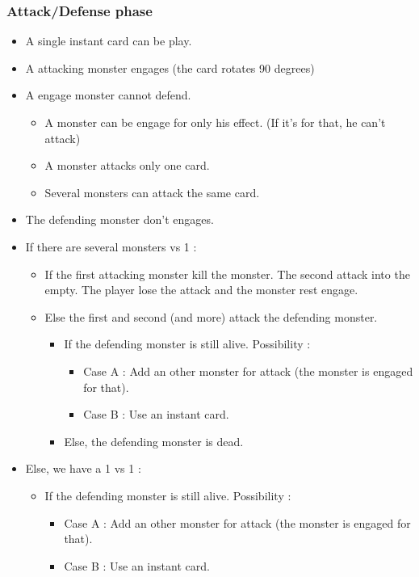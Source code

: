 \documentclass[a4paper,12pt]{book}
\begin{document}
\subsubsection{Attack/Defense phase}
\begin{itemize}
	\item A single instant card can be play.
	\item A attacking monster engages (the card rotates 90 degrees)
	\item A engage monster cannot defend.
		\begin{itemize}
			\item A monster can be engage for only his effect. (If it's for that, he can't attack)
			\item A monster attacks only one card.
			\item Several monsters can attack the same card.
		\end{itemize}
	\item The defending monster don't engages.
	\item If there are several monsters vs 1 :
		\begin{itemize}
			\item If the first attacking monster kill the monster. The second attack into the empty. The player lose the attack and the monster rest engage.
			\item Else the first and second (and more) attack the defending monster.
				\begin{itemize}
					\item If the defending monster is still alive. Possibility :
					\begin{itemize}
						\item Case A : Add an other monster for attack (the monster is engaged for that).
						\item Case B : Use an instant card.
					\end{itemize}
					\item Else, the defending monster is dead.
				\end{itemize}
		\end{itemize}
\item Else, we have a 1 vs 1 :
	\begin{itemize}
	\item If the defending monster is still alive. Possibility :
	\begin{itemize}
		\item Case A : Add an other monster for attack (the monster is engaged for that).
		\item Case B : Use an instant card.

\end{itemize}
\end{itemize}
\end{itemize}
\end{document}
